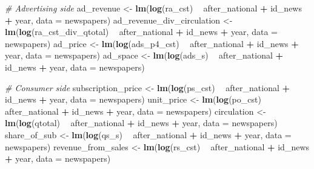 \documentclass[
]{book}
\newenvironment{Shaded}{\begin{snugshade}}{\end{snugshade}}
\newcommand{\CommentTok}[1]{\textcolor[rgb]{0.56,0.35,0.01}{\textit{#1}}}
\newcommand{\DataTypeTok}[1]{\textcolor[rgb]{0.13,0.29,0.53}{#1}}
\newcommand{\KeywordTok}[1]{\textcolor[rgb]{0.13,0.29,0.53}{\textbf{#1}}}
\newcommand{\NormalTok}[1]{#1}
\newcommand{\OperatorTok}[1]{\textcolor[rgb]{0.81,0.36,0.00}{\textbf{#1}}}
\newcommand{\StringTok}[1]{\textcolor[rgb]{0.31,0.60,0.02}{#1}}
\begin{document}
\begin{Shaded}
\begin{Highlighting}[]
\CommentTok{# Advertising side}
\NormalTok{ad_revenue <-}\StringTok{ }\KeywordTok{lm}\NormalTok{(}\KeywordTok{log}\NormalTok{(ra_cst) }\OperatorTok{~}\StringTok{ }\NormalTok{after_national }\OperatorTok{+}\StringTok{ }\NormalTok{id_news }\OperatorTok{+}\StringTok{ }\NormalTok{year, }\DataTypeTok{data =}\NormalTok{ newspapers)}
\NormalTok{ad_revenue_div_circulation <-}\StringTok{ }\KeywordTok{lm}\NormalTok{(}\KeywordTok{log}\NormalTok{(ra_cst_div_qtotal) }\OperatorTok{~}\StringTok{ }\NormalTok{after_national }\OperatorTok{+}\StringTok{ }\NormalTok{id_news }\OperatorTok{+}\StringTok{ }\NormalTok{year, }\DataTypeTok{data =}\NormalTok{ newspapers)}
\NormalTok{ad_price <-}\StringTok{ }\KeywordTok{lm}\NormalTok{(}\KeywordTok{log}\NormalTok{(ads_p4_cst) }\OperatorTok{~}\StringTok{ }\NormalTok{after_national }\OperatorTok{+}\StringTok{ }\NormalTok{id_news }\OperatorTok{+}\StringTok{ }\NormalTok{year, }\DataTypeTok{data =}\NormalTok{ newspapers)}
\NormalTok{ad_space <-}\StringTok{ }\KeywordTok{lm}\NormalTok{(}\KeywordTok{log}\NormalTok{(ads_s) }\OperatorTok{~}\StringTok{ }\NormalTok{after_national }\OperatorTok{+}\StringTok{ }\NormalTok{id_news }\OperatorTok{+}\StringTok{ }\NormalTok{year, }\DataTypeTok{data =}\NormalTok{ newspapers)}

\CommentTok{# Consumer side}
\NormalTok{subscription_price <-}\StringTok{ }\KeywordTok{lm}\NormalTok{(}\KeywordTok{log}\NormalTok{(ps_cst) }\OperatorTok{~}\StringTok{ }\NormalTok{after_national }\OperatorTok{+}\StringTok{ }\NormalTok{id_news }\OperatorTok{+}\StringTok{ }\NormalTok{year, }\DataTypeTok{data =}\NormalTok{ newspapers)}
\NormalTok{unit_price <-}\StringTok{ }\KeywordTok{lm}\NormalTok{(}\KeywordTok{log}\NormalTok{(po_cst) }\OperatorTok{~}\StringTok{ }\NormalTok{after_national }\OperatorTok{+}\StringTok{ }\NormalTok{id_news }\OperatorTok{+}\StringTok{ }\NormalTok{year, }\DataTypeTok{data =}\NormalTok{ newspapers)}
\NormalTok{circulation <-}\StringTok{ }\KeywordTok{lm}\NormalTok{(}\KeywordTok{log}\NormalTok{(qtotal) }\OperatorTok{~}\StringTok{ }\NormalTok{after_national }\OperatorTok{+}\StringTok{ }\NormalTok{id_news }\OperatorTok{+}\StringTok{ }\NormalTok{year, }\DataTypeTok{data =}\NormalTok{ newspapers)}
\NormalTok{share_of_sub <-}\StringTok{ }\KeywordTok{lm}\NormalTok{(}\KeywordTok{log}\NormalTok{(qs_s) }\OperatorTok{~}\StringTok{ }\NormalTok{after_national }\OperatorTok{+}\StringTok{ }\NormalTok{id_news }\OperatorTok{+}\StringTok{ }\NormalTok{year, }\DataTypeTok{data =}\NormalTok{ newspapers)}
\NormalTok{revenue_from_sales <-}\StringTok{ }\KeywordTok{lm}\NormalTok{(}\KeywordTok{log}\NormalTok{(rs_cst) }\OperatorTok{~}\StringTok{ }\NormalTok{after_national }\OperatorTok{+}\StringTok{ }\NormalTok{id_news }\OperatorTok{+}\StringTok{ }\NormalTok{year, }\DataTypeTok{data =}\NormalTok{ newspapers)}
\end{Highlighting}
\end{Shaded}
\end{document}
